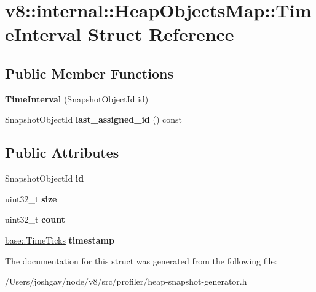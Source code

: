 \hypertarget{structv8_1_1internal_1_1_heap_objects_map_1_1_time_interval}{}\section{v8\+:\+:internal\+:\+:Heap\+Objects\+Map\+:\+:Time\+Interval Struct Reference}
\label{structv8_1_1internal_1_1_heap_objects_map_1_1_time_interval}
\subsection*{Public Member Functions}
\begin{DoxyCompactItemize}
\item 
{\bfseries Time\+Interval} (Snapshot\+Object\+Id id)\hypertarget{structv8_1_1internal_1_1_heap_objects_map_1_1_time_interval_a034e331cfb6aff3dd752359abe5a8e46}{}\label{structv8_1_1internal_1_1_heap_objects_map_1_1_time_interval_a034e331cfb6aff3dd752359abe5a8e46}

\item 
Snapshot\+Object\+Id {\bfseries last\+\_\+assigned\+\_\+id} () const \hypertarget{structv8_1_1internal_1_1_heap_objects_map_1_1_time_interval_a7049eebe1a490a48777f61517d90550a}{}\label{structv8_1_1internal_1_1_heap_objects_map_1_1_time_interval_a7049eebe1a490a48777f61517d90550a}

\end{DoxyCompactItemize}
\subsection*{Public Attributes}
\begin{DoxyCompactItemize}
\item 
Snapshot\+Object\+Id {\bfseries id}\hypertarget{structv8_1_1internal_1_1_heap_objects_map_1_1_time_interval_a72584d484e3384ca69a31b7365196a56}{}\label{structv8_1_1internal_1_1_heap_objects_map_1_1_time_interval_a72584d484e3384ca69a31b7365196a56}

\item 
uint32\+\_\+t {\bfseries size}\hypertarget{structv8_1_1internal_1_1_heap_objects_map_1_1_time_interval_a5a42f1b26719a226735a9751d51cf90c}{}\label{structv8_1_1internal_1_1_heap_objects_map_1_1_time_interval_a5a42f1b26719a226735a9751d51cf90c}

\item 
uint32\+\_\+t {\bfseries count}\hypertarget{structv8_1_1internal_1_1_heap_objects_map_1_1_time_interval_a4c483a95cfdec144e1a9aef2a3754753}{}\label{structv8_1_1internal_1_1_heap_objects_map_1_1_time_interval_a4c483a95cfdec144e1a9aef2a3754753}

\item 
\hyperlink{classv8_1_1base_1_1_time_ticks}{base\+::\+Time\+Ticks} {\bfseries timestamp}\hypertarget{structv8_1_1internal_1_1_heap_objects_map_1_1_time_interval_a1e63e8711a20ae816b3c6f984fcaeb76}{}\label{structv8_1_1internal_1_1_heap_objects_map_1_1_time_interval_a1e63e8711a20ae816b3c6f984fcaeb76}

\end{DoxyCompactItemize}


The documentation for this struct was generated from the following file\+:\begin{DoxyCompactItemize}
\item 
/\+Users/joshgav/node/v8/src/profiler/heap-\/snapshot-\/generator.\+h\end{DoxyCompactItemize}
